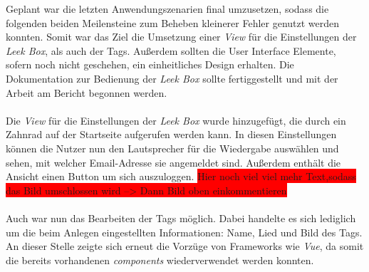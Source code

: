 \documentclass[10pt, a4paper]{article}
\begin{document}
Geplant war die letzten Anwendungszenarien final umzusetzen, sodass die folgenden beiden Meilensteine zum Beheben kleinerer Fehler genutzt werden konnten.
Somit war das Ziel die Umsetzung einer \textit{View} für die Einstellungen der \textit{Leek Box}, als auch der Tags.
Außerdem sollten die User Interface Elemente, sofern noch nicht geschehen, ein einheitliches Design erhalten.
Die Dokumentation zur Bedienung der \textit{Leek Box} sollte fertiggestellt und mit der Arbeit am Bericht begonnen werden.
\\~\\
Die \textit{View} für die Einstellungen der \textit{Leek Box} wurde hinzugefügt, die durch ein Zahnrad auf der Startseite aufgerufen werden kann.
In diesen Einstellungen können die Nutzer nun den Lautsprecher für die Wiedergabe auswählen und sehen, mit welcher Email-Adresse sie angemeldet sind. Außerdem enthält die Ansicht einen Button um sich auszuloggen.
\colorbox{red}{Hier noch viel viel mehr Text,sodass das Bild umschlossen wird --> Dann Bild oben einkommentieren }
\\~\\
Auch war nun das Bearbeiten der Tags möglich.
Dabei handelte es sich lediglich um die beim Anlegen eingestellten Informationen: Name, Lied und Bild des Tags.
An dieser Stelle zeigte sich erneut die Vorzüge von Frameworks wie  \textit{Vue}, da somit die bereits vorhandenen \textit{components} wiederverwendet werden konnten.
\end{document}
